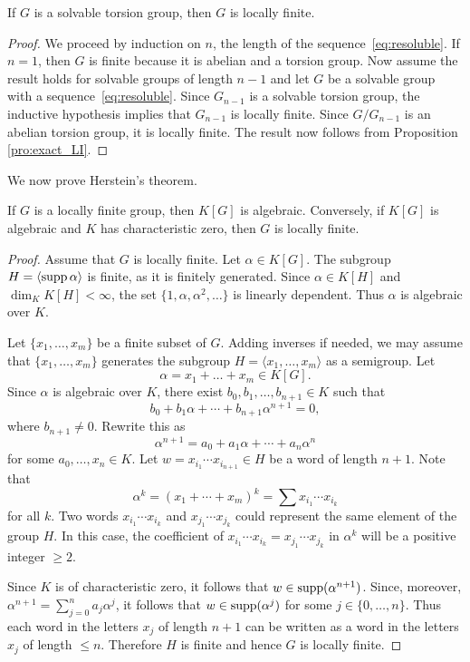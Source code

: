 \begin{proposition}
	If $G$ is a solvable torsion group, 
	then $G$ is locally finite. 
\end{proposition}

\begin{proof}
	We proceed by induction on $n$, the length of the sequence~\eqref{eq:resoluble}. 
	If $n=1$, then $G$ is finite because it is abelian and a torsion group.
	Now assume the result holds for solvable groups of length $n-1$ and let
	$G$ be a solvable group with a sequence~\eqref{eq:resoluble}. Since $G_{n-1}$ is 
	a solvable torsion group, the inductive hypothesis implies that 
	$G_{n-1}$ is locally finite. Since $G/G_{n-1}$ is an abelian torsion group, 
	it is locally finite. The result now follows from Proposition \ref{pro:exact_LI}.
\end{proof}

We now prove Herstein's theorem.

\begin{theorem}[Herstein]
	If $G$ is a locally finite group, then $K[G]$ is algebraic. Conversely, if 
	$K[G]$ is algebraic and $K$ has characteristic zero, then $G$ 
	is locally finite. 
\end{theorem}

\begin{proof}
	Assume that $G$ is locally finite. Let $\alpha\in K[G]$. The subgroup 
	$H=\langle\operatorname{supp}\alpha\rangle$ is finite, as it is finitely generated. Since 
	$\alpha\in K[H]$ and $\dim_KK[H]<\infty$, the set 
	$\{1,\alpha,\alpha^2,\dots\}$ is linearly dependent. Thus $\alpha$ is
	algebraic over $K$.

	Let $\{x_1,\dots,x_m\}$ be a finite subset of $G$. Adding inverses if needed,
	we may assume that $\{x_1,\dots,x_m\}$ generates the subgroup 
	$H=\langle x_1,\dots,x_m\rangle$ as a semigroup. Let 
	\[
	\alpha=x_1+\dots+x_m\in K[G].
	\]
	Since $\alpha$ is algebraic over $K$, 
	there exist $b_0,b_1,\dots,b_{n+1}\in K$ such that 
	\[
	b_0+b_1\alpha+\cdots+b_{n+1}\alpha^{n+1}=0,
	\]
	where $b_{n+1}\ne 0$. Rewrite this as 
	\[
		\alpha^{n+1}=a_0+a_1\alpha+\cdots+a_n\alpha^n
	\]
	for some $a_0,\dots,x_n\in K$. Let $w=x_{i_1}\cdots
	x_{i_{n+1}}\in H$ be a word of length $n+1$. 
	Note that 
	\[
		\alpha^{k}=(x_1+\cdots+x_m)^{k}
		=\sum x_{i_1}\cdots x_{i_{k}}
	\]
	for all $k$. 
	Two words $x_{i_1}\cdots x_{i_{k}}$ and 
	$x_{j_1}\cdots x_{j_{k}}$ could represent the same element of the group $H$. In this case, 
	the coefficient of $x_{i_1}\cdots x_{i_{k}}=x_{j_1}\cdots x_{j_{k}}$ 
	in $\alpha^{k}$ will be a positive integer $\geq2$.  
	
	Since $K$
	is of characteristic zero, it follows that $w\in\operatorname{supp}(\alpha^{n+1})$. Since, moreover,  
	$\alpha^{n+1}=\sum_{j=0}^na_j\alpha^j$, it follows that 
	$w\in\operatorname{supp}(\alpha^j)$ for some $j\in\{0,\dots,n\}$. Thus each
	word in the letters $x_j$ of length $n+1$ can be written as a word in the letters $x_j$ of 
	length $\leq n$. Therefore $H$ is finite and hence $G$ is locally finite. 
\end{proof}

